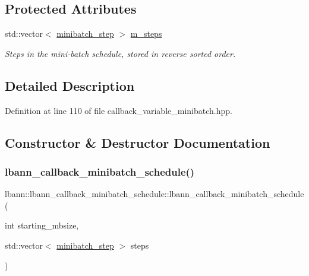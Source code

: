 \subsection*{Protected Attributes}
\begin{DoxyCompactItemize}
\item 
std\+::vector$<$ \hyperlink{structlbann_1_1lbann__callback__minibatch__schedule_1_1minibatch__step}{minibatch\+\_\+step} $>$ \hyperlink{classlbann_1_1lbann__callback__minibatch__schedule_a05084eeba07e54fa11eed1a414b7aeeb}{m\+\_\+steps}
\begin{DoxyCompactList}\small\item\em Steps in the mini-\/batch schedule, stored in reverse sorted order. \end{DoxyCompactList}\end{DoxyCompactItemize}


\subsection{Detailed Description}


Definition at line 110 of file callback\+\_\+variable\+\_\+minibatch.\+hpp.



\subsection{Constructor \& Destructor Documentation}
\mbox{\label{classlbann_1_1lbann__callback__minibatch__schedule_adceb97a2732247213fd25b3f1e824105}} 
\subsubsection{\texorpdfstring{lbann\+\_\+callback\+\_\+minibatch\+\_\+schedule()}{lbann\_callback\_minibatch\_schedule()}\hspace{0.1cm}{\footnotesize\ttfamily [1/2]}}
{\footnotesize\ttfamily lbann\+::lbann\+\_\+callback\+\_\+minibatch\+\_\+schedule\+::lbann\+\_\+callback\+\_\+minibatch\+\_\+schedule (\begin{DoxyParamCaption}\item[{int}]{starting\+\_\+mbsize,  }\item[{std\+::vector$<$ \hyperlink{structlbann_1_1lbann__callback__minibatch__schedule_1_1minibatch__step}{minibatch\+\_\+step} $>$}]{steps }\end{DoxyParamCaption})}



